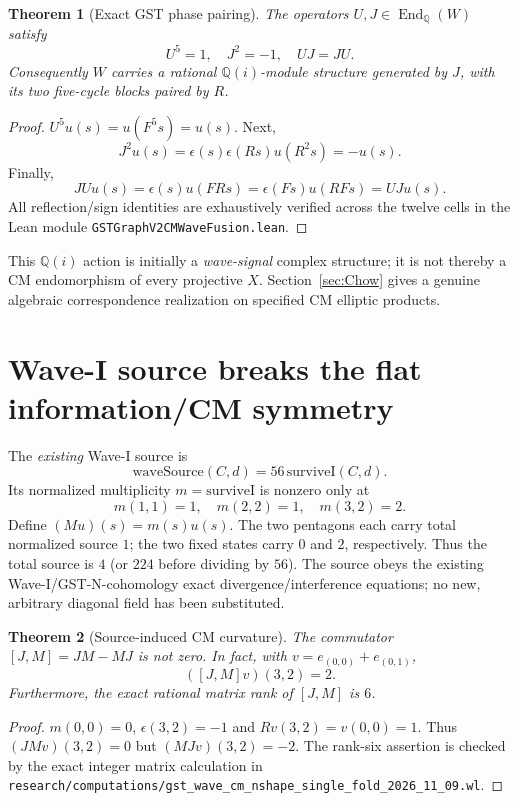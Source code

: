 \documentclass[11pt]{article}
\newtheorem{theorem}{Theorem}
\newcommand{\QQ}{\mathbb Q}
\begin{document}
\begin{theorem}[Exact GST phase pairing]\label{th:CM}
The operators \(U,J\in\operatorname{End}_{\QQ}(W)\) satisfy
\[
 \boxed{U^5=1,\quad J^2=-1,\quad UJ=JU.}
\]
Consequently \(W\) carries a rational \(\QQ(i)\)-module structure generated by \(J\), with its two five-cycle blocks paired by \(R\).
\end{theorem}
\begin{proof}
\(U^5u(s)=u(F^5s)=u(s)\). Next,
\[
 J^2u(s)=\epsilon(s)\epsilon(Rs)u(R^2s)=-u(s).
\]
Finally,
\[
 JUu(s)=\epsilon(s)u(FRs)=\epsilon(Fs)u(RFs)=UJu(s).
\]
All reflection/sign identities are exhaustively verified across the twelve cells in the Lean module \texttt{GSTGraphV2CMWaveFusion.lean}.
\end{proof}

This \(\QQ(i)\) action is initially a \emph{wave-signal} complex structure; it is not thereby a CM endomorphism of every projective \(X\). Section~\ref{sec:Chow} gives a genuine algebraic correspondence realization on specified CM elliptic products.

\section{Wave-I source breaks the flat information/CM symmetry}

The \emph{existing} Wave-I source is
\[
 \mathrm{waveSource}(C,d)=56\,\mathrm{surviveI}(C,d).
\]
Its normalized multiplicity \(m=\mathrm{surviveI}\) is nonzero only at
\[
 m(1,1)=1,\quad m(2,2)=1,\quad m(3,2)=2.
\]
Define \((Mu)(s)=m(s)u(s)\). The two pentagons each carry total normalized source \(1\); the two fixed states carry \(0\) and \(2\), respectively. Thus the total source is \(4\) (or \(224\) before dividing by \(56\)).
The source obeys the existing Wave-I/GST-N-cohomology exact divergence/interference equations; no new, arbitrary diagonal field has been substituted.

\begin{theorem}[Source-induced CM curvature]\label{th:curvature}
The commutator \([J,M]=JM-MJ\) is not zero. In fact, with
\(v=e_{(0,0)}+e_{(0,1)}\),
\[
 ([J,M]v)(3,2)=2.
\]
Furthermore, the exact rational matrix rank of \([J,M]\) is \(6\).
\end{theorem}
\begin{proof}
\(m(0,0)=0\), \(\epsilon(3,2)=-1\) and \(Rv(3,2)=v(0,0)=1\).
Thus \((JMv)(3,2)=0\) but \((MJv)(3,2)=-2\).
The rank-six assertion is checked by the exact integer matrix calculation
in \texttt{research/computations/gst\_wave\_cm\_nshape\_single\_fold\_2026\_11\_09.wl}.
\end{proof}
\end{document}

